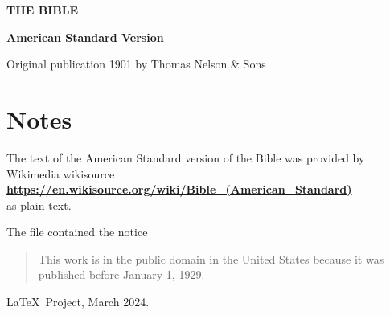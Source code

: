 \documentclass[
  twoside,hidelinks
  ]{memoir}
\makeatletter
\let\@starttoc\ori@starttoc
\renewcommand\tableofcontents{%
  \onecolumn
  \chapter*{\contentsname
        \@mkboth{%
           \MakeUppercase\contentsname}{\MakeUppercase\contentsname}}%
    \@starttoc{toc}%
    \twocolumn
    }
\makeatother
\begin{document}
\frontmatter
\thispagestyle{empty}

\vspace*{1cm}

\begin{center}

{\HUGE\leavevmode{}\textbf{THE BIBLE}}

\vspace{1cm}
{\huge\textbf{American Standard Version}}

\tagstructend

\vspace{2in}

Original publication 1901 by Thomas Nelson \& Sons

\end{center}

\clearpage
\thispagestyle{empty}

\chapter{Notes}

\begingroup
  \setlength\parindent{0pt}
  \setlength\parskip{\bigskipamount}


The text of the American Standard version of the Bible was provided by
Wikimedia wikisource\\
\textbf{\url{https://en.wikisource.org/wiki/Bible_(American_Standard)}}\\
as plain text.

The file contained the notice

\begin{quote}
This work is in the public domain in the United States because it was
published before January 1, 1929.
  
\end{quote}


  
\LaTeX\ Project, March 2024.

\endgroup

\clearpage
\tableofcontents

\mainmatter
\twocolumn


\end{document}

